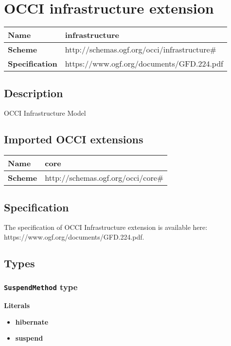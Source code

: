 \section{OCCI infrastructure extension}
\begin{center}
\begin{tabular}{|l|l|}
  \hline
  \textbf{Name} & infrastructure \\
  \hline  
  \textbf{Scheme} & http://schemas.ogf.org/occi/infrastructure\# \\
  \hline
  \textbf{Specification} & https://www.ogf.org/documents/GFD.224.pdf \\
  \hline
\end{tabular}
\end{center}

\subsection{Description}
OCCI Infrastructure Model
\subsection{Imported OCCI extensions}

\begin{center} 
\begin{tabular}{|l|l|}
  \hline
  \textbf{Name} & core \\
  \hline  
  \textbf{Scheme} & http://schemas.ogf.org/occi/core\# \\
  \hline
\end{tabular}
\end{center}


\subsection{Specification}
The specification of OCCI Infrastructure extension is available here: https://www.ogf.org/documents/GFD.224.pdf.
\subsection{Types}
\subsubsection{\texttt{SuspendMethod} type}

\textbf{Literals}
\begin{itemize}
\item \textbf{hibernate} 
\end{itemize}
\begin{itemize}
\item \textbf{suspend} 
\end{itemize}

